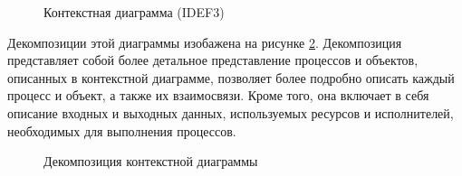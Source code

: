         \begin{figure}[H]%
            \centering
            \caption{Контекстная диаграмма (IDEF3)} \label{context-diagram}
        \end{figure} 
        
        Декомпозиции этой диаграммы изобажена на рисунке \ref{context-decomposition}. %
        Декомпозиция представляет собой более детальное %
        представление процессов и объектов, описанных в контекстной диаграмме, позволяет %
        более подробно описать каждый процесс и объект, а также их взаимосвязи. Кроме того, %
        она включает в себя описание входных и выходных данных, используемых ресурсов и %
        исполнителей, необходимых для выполнения процессов.


        \begin{landscape}
            \begin{figure}[H]%
                \centering
                \caption{Декомпозиция контекстной диаграммы} \label{context-decomposition}
            \end{figure} 
        \end{landscape}

